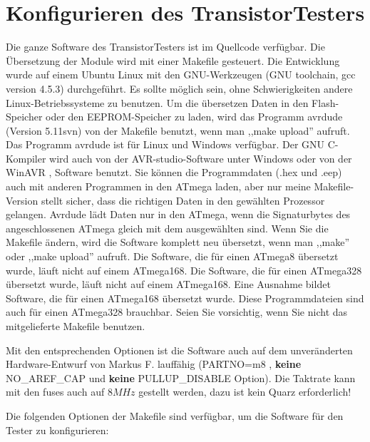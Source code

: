 \chapter{Konfigurieren des TransistorTesters}
\label{sec:config}
Die ganze Software des TransistorTesters ist im Quellcode verfügbar.
Die Übersetzung der Module wird mit einer Makefile gesteuert. Die Entwicklung wurde
auf einem Ubuntu Linux mit den GNU-Werkzeugen (GNU toolchain, gcc version 4.5.3) durchgeführt.
Es sollte möglich sein, ohne Schwierigkeiten andere Linux-Betriebssysteme zu benutzen.
Um die übersetzen Daten in den Flash-Speicher oder den EEPROM-Speicher zu laden, wird das
Programm avrdude \cite{avrdude} (Version 5.11svn) von der Makefile benutzt, wenn man ,,make upload'' aufruft.
Das Programm avrdude ist für Linux und Windows verfügbar.
Der GNU C-Kompiler wird auch von der AVR-studio-Software unter Windows oder von
der WinAVR \cite{winavr1},\cite{winavr2} Software benutzt.
Sie können die Programmdaten (.hex und .eep) auch mit anderen Programmen in den ATmega laden,
aber nur meine Makefile-Version stellt sicher, dass die richtigen Daten in den gewählten Prozessor gelangen.
Avrdude lädt Daten nur in den ATmega, wenn die Signaturbytes des angeschlossenen ATmega gleich mit dem ausgewählten sind.
Wenn Sie die Makefile ändern, wird die Software komplett neu übersetzt, wenn man ,,make'' oder
,,make upload'' aufruft.
Die Software, die für einen ATmega8 übersetzt wurde, läuft nicht auf einem ATmega168.
Die Software, die für einen ATmega328 übersetzt wurde, läuft nicht auf einem ATmega168.
Eine Ausnahme bildet Software, die für einen ATmega168 übersetzt wurde. Diese Programmdateien
sind auch für einen ATmega328 brauchbar.
Seien Sie vorsichtig, wenn Sie nicht das mitgelieferte Makefile benutzen.

Mit den entsprechenden Optionen ist die Software auch auf dem unveränderten Hardware-Entwurf von
Markus F. lauffähig (PARTNO=m8 , {\bf keine} NO\_AREF\_CAP und {\bf keine} PULLUP\_DISABLE Option).
Die Taktrate kann mit den fuses auch auf \(8MHz\) gestellt werden, dazu ist kein Quarz erforderlich!


Die folgenden Optionen der Makefile sind verfügbar, um die Software für den Tester zu konfigurieren:

